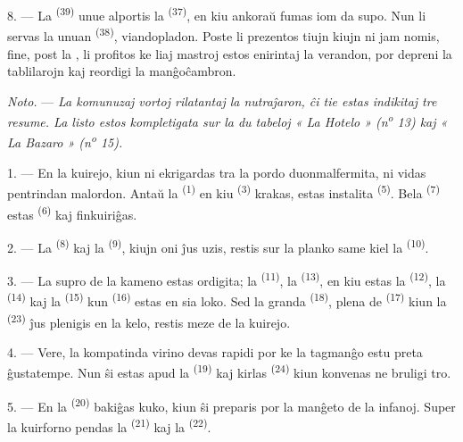 8. --- La  \textsuperscript{(39)} unue alportis la
 \textsuperscript{(37)}, en kiu ankoraŭ fumas iom da supo. Nun
li servas la unuan  \textsuperscript{(38)}, viandopladon. Poste
li prezentos tiujn kiujn ni jam nomis, fine, post la , li
profitos ke liaj mastroj estos enirintaj la verandon, por depreni la
tablilarojn kaj reordigi la manĝoĉambron.

\textit{Noto.} --- \textit{La komunuzaj vortoj rilatantaj la nutraĵaron, ĉi
tie estas indikitaj tre resume. La listo estos kompletigata sur la du tabeloj
« La Hotelo » (n\textsuperscript{o} 13) kaj « La Bazaro » (n\textsuperscript{o}
15).}

\VUsaut{4.6mm}
\VUsaut{3.0mm}

1. --- En la kuirejo, kiun ni ekrigardas tra la pordo duonmalfermita, ni vidas
pentrindan malordon. Antaŭ la  \textsuperscript{(1)} en kiu
 \textsuperscript{(3)} krakas, estas instalita
 \textsuperscript{(5)}. Bela 
\textsuperscript{(7)} estas  \textsuperscript{(6)}
kaj finkuiriĝas.

2. --- La  \textsuperscript{(8)} kaj la 
\textsuperscript{(9)}, kiujn oni ĵus uzis, restis sur la planko same kiel la
 \textsuperscript{(10)}.

3. --- La supro de la kameno estas ordigita; la 
\textsuperscript{(11)}, la  \textsuperscript{(13)}, en kiu
estas la  \textsuperscript{(12)}, la 
\textsuperscript{(14)} kaj la  \textsuperscript{(15)} kun
 \textsuperscript{(16)} estas en sia loko. Sed la granda
 \textsuperscript{(18)}, plena de 
\textsuperscript{(17)} kiun la  \textsuperscript{(23)} ĵus
plenigis en la kelo, restis meze de la kuirejo.

4. --- Vere, la kompatinda virino devas rapidi por ke la tagmanĝo estu preta
ĝustatempe. Nun ŝi estas apud la  \textsuperscript{(19)} kaj
kirlas  \textsuperscript{(24)} kiun konvenas ne bruligi tro.

5. --- En la  \textsuperscript{(20)} bakiĝas kuko, kiun ŝi
preparis por la manĝeto de la infanoj. Super la kuirforno pendas la
 \textsuperscript{(21)} kaj la 
\textsuperscript{(22)}.

